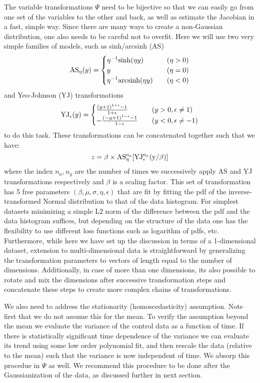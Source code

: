 \documentclass{article}
\begin{document}
The variable transformations $\Psi$ need to be bijective so that we can easily go from one set of the variables to the other and back, as well as estimate the Jacobian in a fast, simple way. Since there are many ways to create a non-Gaussian distribution, one also needs to be careful not to overfit. Here we will use two very simple families of models, such as sinh/arcsinh (AS) \cite{Schuhmann16}
\[
  {\rm AS}_\eta(y) =\begin{cases}
               \eta ^{-1} {\rm sinh}(\eta y) &\quad (\eta>0)\\
               y & \quad (\eta=0)\\
               \eta ^{-1} {\rm arcsinh} (\eta y) &\quad (\eta<0)
            \end{cases}
\]
 and Yeo-Johnson (YJ) transformations \cite{yjtransform}
\[
  {\rm YJ}_\epsilon(y) =\begin{cases}
               \frac{(y+1)^{1+\epsilon } - 1}{1+\epsilon}  &\quad (y>0, \epsilon \neq 1)\\
               -\frac{(-y+1)^{1-\epsilon } - 1 }{1-\epsilon}  &\quad (y<0, \epsilon \neq -1)
            \end{cases}
\]
to do this task. These transformations can be concatenated together such that we have:
\begin{equation}
    z = \beta \times\rm{AS}_\eta^{n_a} [ {\rm YJ}_\epsilon^{n_y} (y/\beta)]
\end{equation}
where the index $n_a, n_y$ are the number of times we successively apply AS and YJ transformations respectively and $\beta$ is a scaling factor. This set of transformation has 5 free parameters $(\beta, \mu, \sigma, \eta, \epsilon)$ that are fit by fitting the pdf of the inverse-transformed Normal distribution to that of the data histogram. For simplest datasets minimizing a simple L2 norm of the difference between the pdf and the data histogram suffices, but depending on the structure of the data one has the flexibility to use different loss functions such as logarithm of pdfs, etc. Furthermore, while here we have set up the discussion in terms of a 1-dimensional dataset, extension to multi-dimensional data is straightforward by generalizing the transformation parameters to vectors of length equal to the number of dimensions. Additionally, in case of more than one dimensions, its also possible to rotate and mix the dimensions after successive transformation steps and concatenate these steps to create more complex chains of transformations. 

We also need to address the stationarity (homoscedasticity) 
assumption. Note first that we do not assume this for the 
mean. 
To verify the assumption beyond the mean
we evaluate the variance of the control
data as a function of time. If there is statistically 
significant time dependence of the variance 
we can evaluate its trend 
using some low order polynomial fit, and then rescale
the data (relative to the mean) such that the variance is now 
independent of time. We absorp this procedue in $\Psi$ as well. 
We recommend this procedure to be done after the Gaussianization of the data, as discussed further in next section. 
\end{document}
